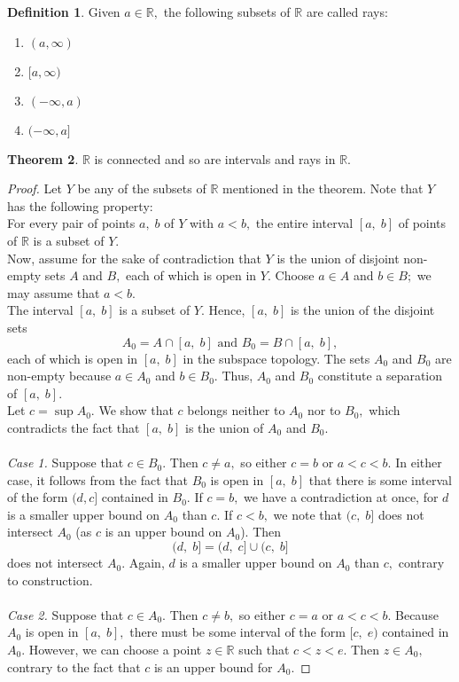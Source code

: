 \documentclass{article}
\theoremstyle{definition}
\newtheorem{theorem}{Theorem}[section]
\newtheorem{defn}[theorem]{Definition}
\begin{document}
%
\begin{defn}
  Given $a \in \mathbb{R},$ the following subsets of $\mathbb{R}$ are called rays:
  \begin{enumerate}[nosep] 
    \item $(a, \infty)$
    \item $[a, \infty)$
    \item $(-\infty, a)$
    \item $(-\infty, a]$
  \end{enumerate}
\end{defn}
%
\begin{theorem}
  $\mathbb{R}$ is connected and so are intervals and rays in $\mathbb{R}.$
\end{theorem}
\begin{proof}
  Let $Y$ be any of the subsets of $\mathbb{R}$ mentioned in the theorem. Note that $Y$ has the following property:\\
  For every pair of points $a,\;b$ of $Y$ with $a < b,$ the entire interval $[a,\;b]$ of points of $\mathbb{R}$ is a subset of $Y.$\\
  Now, assume for the sake of contradiction that $Y$ is the union of disjoint non-empty sets $A$ and $B,$ each of which is open in $Y.$ Choose $a \in A$ and $b \in B;$ we may assume that $a < b.$\\
  The interval $[a,\; b]$ is a subset of $Y.$ Hence, $[a,\;b]$ is the union of the disjoint sets
  \[A_0 = A \cap [a,\;b] \text{ and } B_0 = B\cap[a,\; b],\]
  each of which is open in $[a,\;b]$ in the subspace topology. The sets $A_0$ and $B_0$ are non-empty because $a \in A_0$ and $b \in B_0.$ Thus, $A_0$ and $B_0$ constitute a separation of $[a,\;b].$\\
  Let $c = \sup A_0.$ We show that $c$ belongs neither to $A_0$ nor to $B_0,$ which contradicts the fact that $[a,\;b]$ is the union of $A_0$ and $B_0.$\\~\\
  \emph{Case 1.} Suppose that $c \in B_0.$ Then $c \neq a,$ so either $c = b$ or $a < c < b.$ In either case, it follows from the fact that $B_0$ is open in $[a,\;b]$ that there is some interval of the form $(d, c]$ contained in $B_0.$ If $c = b,$ we have a contradiction at once, for $d$ is a smaller upper bound on $A_0$ than $c.$ If $c < b,$ we note that $(c,\;b]$ does not intersect $A_0$ (as $c$ is an upper bound on $A_0$). Then
  \[(d,\;b] = (d,\;c] \cup (c,\;b]\]
  does not intersect $A_0.$ Again, $d$ is a smaller upper bound on $A_0$ than $c,$ contrary to construction.\\~\\
  \emph{Case 2.} Suppose that $c \in A_0.$ Then $c \neq b,$ so either $c = a$ or $a < c < b.$ Because $A_0$ is open in $[a,\; b],$ there must be some interval of the form $[c,\;e)$ contained in $A_0.$ However, we can choose a point $z \in \mathbb{R}$ such that $c < z < e.$ Then $z \in A_0,$ contrary to the fact that $c$ is an upper bound for $A_0.$
\end{proof}
\end{document}
